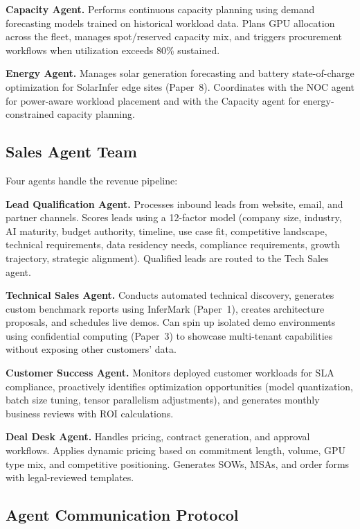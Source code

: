 \documentclass[conference,10pt,letterpaper]{IEEEtran}
\begin{document}
\textbf{Capacity Agent.} Performs continuous capacity planning using demand forecasting models trained on historical workload data. Plans GPU allocation across the fleet, manages spot/reserved capacity mix, and triggers procurement workflows when utilization exceeds 80\% sustained.

\textbf{Energy Agent.} Manages solar generation forecasting and battery state-of-charge optimization for SolarInfer edge sites (Paper~8). Coordinates with the NOC agent for power-aware workload placement and with the Capacity agent for energy-constrained capacity planning.

\subsection{Sales Agent Team}

Four agents handle the revenue pipeline:

\textbf{Lead Qualification Agent.} Processes inbound leads from website, email, and partner channels. Scores leads using a 12-factor model (company size, industry, AI maturity, budget authority, timeline, use case fit, competitive landscape, technical requirements, data residency needs, compliance requirements, growth trajectory, strategic alignment). Qualified leads are routed to the Tech Sales agent.

\textbf{Technical Sales Agent.} Conducts automated technical discovery, generates custom benchmark reports using InferMark (Paper~1), creates architecture proposals, and schedules live demos. Can spin up isolated demo environments using confidential computing (Paper~3) to showcase multi-tenant capabilities without exposing other customers' data.

\textbf{Customer Success Agent.} Monitors deployed customer workloads for SLA compliance, proactively identifies optimization opportunities (model quantization, batch size tuning, tensor parallelism adjustments), and generates monthly business reviews with ROI calculations.

\textbf{Deal Desk Agent.} Handles pricing, contract generation, and approval workflows. Applies dynamic pricing based on commitment length, volume, GPU type mix, and competitive positioning. Generates SOWs, MSAs, and order forms with legal-reviewed templates.

\subsection{Agent Communication Protocol}
\end{document}

